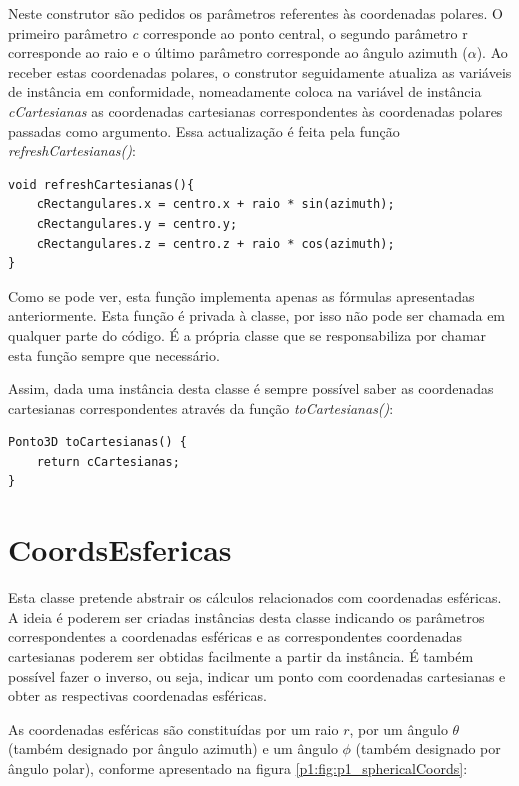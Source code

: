Neste construtor são pedidos os parâmetros referentes às coordenadas polares. O primeiro parâmetro \textit{c} corresponde ao ponto central, o segundo parâmetro r corresponde ao raio e o último parâmetro corresponde ao ângulo azimuth ($\alpha$). Ao receber estas coordenadas polares, o construtor seguidamente atualiza as variáveis de instância em conformidade, nomeadamente coloca na variável de instância \textit{cCartesianas} as coordenadas cartesianas correspondentes às coordenadas polares passadas como argumento. Essa actualização é feita pela função \textit{refreshCartesianas()}:

\begin{Verbatim}
void refreshCartesianas(){
	cRectangulares.x = centro.x + raio * sin(azimuth);
	cRectangulares.y = centro.y;
	cRectangulares.z = centro.z + raio * cos(azimuth);
}
\end{Verbatim}

Como se pode ver, esta função implementa apenas as fórmulas apresentadas anteriormente. Esta função é privada à classe, por isso não pode ser chamada em qualquer parte do código. É a própria classe que se responsabiliza por chamar esta função sempre que necessário.

Assim, dada uma instância desta classe é sempre possível saber as coordenadas cartesianas correspondentes através da função \textit{toCartesianas()}:

\begin{Verbatim}
Ponto3D toCartesianas() {
	return cCartesianas;
}
\end{Verbatim}


\section{CoordsEsfericas}
\label{p1:cEsfericas}
Esta classe pretende abstrair os cálculos relacionados com coordenadas esféricas. A ideia é poderem ser criadas instâncias desta classe indicando os parâmetros correspondentes a coordenadas esféricas e as correspondentes coordenadas cartesianas poderem ser obtidas facilmente a partir da instância. É também possível fazer o inverso, ou seja, indicar um ponto com coordenadas cartesianas e obter as respectivas coordenadas esféricas.

As coordenadas esféricas são constituídas por um raio $r$, por um ângulo $\theta$ (também designado por ângulo azimuth) e um ângulo $\phi$ (também designado por ângulo polar), conforme apresentado na figura \ref{p1:fig:p1_sphericalCoords}:

